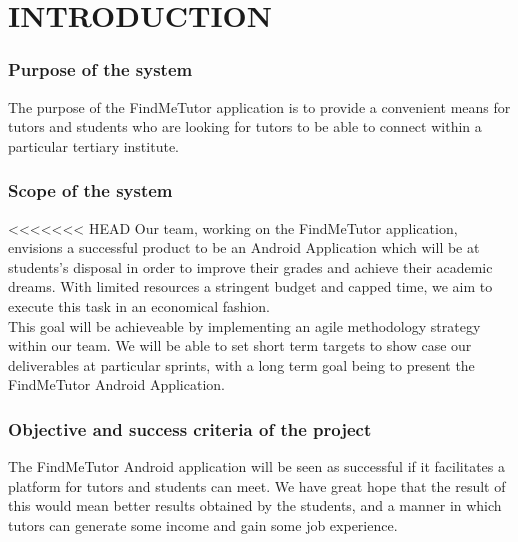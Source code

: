 \documentclass[12pt]{article}
\begin{document}
\section{INTRODUCTION}
\subsubsection{Purpose of the system}
\begin{flushleft}
The purpose of the FindMeTutor application is to provide a convenient means for tutors and students who are looking for tutors to be able to connect within a particular tertiary institute.
\end{flushleft}
\subsubsection{Scope of the system}
\begin{flushleft}
<<<<<<< HEAD
Our team, working on the FindMeTutor application, envisions a successful product to be an Android Application which will be at students's disposal in order to improve their grades and achieve their academic dreams. With limited resources a  stringent budget and capped time, we aim to execute this task in an economical fashion.\\
This goal will be achieveable by implementing an agile methodology strategy within our team. We will be able to set short term targets to show case our deliverables at particular sprints, with a long term goal being to present the FindMeTutor Android Application. 
\end{flushleft}
\subsubsection{Objective and success criteria of the project}
\begin{flushleft}
The FindMeTutor Android application will be seen as successful if it facilitates a platform for tutors and students can meet. We have great hope that the result of this would mean better results obtained by the students, and a manner in which tutors can generate some income and gain some job experience. 
\end{flushleft}
\end{document}
